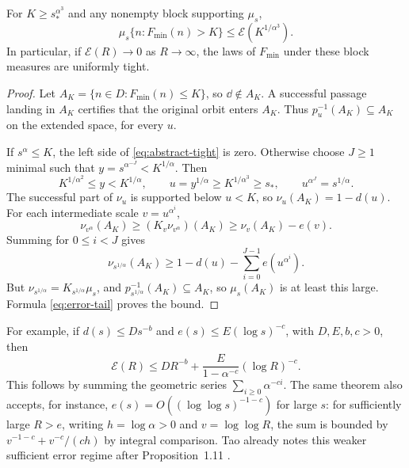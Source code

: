 \begin{theorem}
\label{thm:transport}
For $K\geq s_*^{\alpha^3}$ and any nonempty block supporting $\mu_s$,
\begin{equation}\label{eq:abstract-tight}
 \mu_s\{n:F_{\min}(n)>K\}\leq\mathcal E(K^{1/\alpha^3}).
\end{equation}
In particular, if $\mathcal E(R)\to0$ as $R\to\infty$, the laws of
$F_{\min}$ under these block measures are uniformly tight.
\end{theorem}
\begin{proof}
Let $A_K=\{n\in D:F_{\min}(n)\leq K\}$, so $\dd\notin A_K$.
A successful passage landing in $A_K$ certifies that the original
orbit enters $A_K$.  Thus $p_u^{-1}(A_K)\subseteq A_K$ on the extended
space, for every $u$.

If $s^\alpha\leq K$, the left side of \eqref{eq:abstract-tight} is zero.
Otherwise choose $J\geq1$ minimal such that
$y=s^{\alpha^{-J}}<K^{1/\alpha}$.  Then
\[
 K^{1/\alpha^2}\leq y<K^{1/\alpha},\qquad
 u=y^{1/\alpha}\geq K^{1/\alpha^3}\geq s_*,\qquad
 u^{\alpha^J}=s^{1/\alpha}.
\]
The successful part of $\nu_u$ is supported below $u<K$, so
$\nu_u(A_K)=1-d(u)$.
For each intermediate scale $v=u^{\alpha^i}$,
\[
 \nu_{v^\alpha}(A_K)
 \geq (K_v\nu_{v^\alpha})(A_K)
 \geq \nu_v(A_K)-e(v).
\]
Summing for $0\leq i<J$ gives
\[
 \nu_{s^{1/\alpha}}(A_K)
 \geq1-d(u)-\sum_{i=0}^{J-1}e(u^{\alpha^i}).
\]
But $\nu_{s^{1/\alpha}}=K_{s^{1/\alpha}}\mu_s$, and
$p_{s^{1/\alpha}}^{-1}(A_K)\subseteq A_K$, so
$\mu_s(A_K)$ is at least this large.  Formula \eqref{eq:error-tail}
proves the bound.
\end{proof}

For example, if $d(s)\leq Ds^{-b}$ and $e(s)\leq E(\log s)^{-c}$,
with $D,E,b,c>0$, then
\begin{equation}\label{eq:power-error}
 \mathcal E(R)\leq DR^{-b}
 +\frac{E}{1-\alpha^{-c}}(\log R)^{-c}.
\end{equation}
This follows by summing the geometric series $\sum_{i\geq0}\alpha^{-ci}$.
The same theorem also accepts, for instance,
$e(s)=O((\log\log s)^{-1-c})$ for large $s$: for sufficiently large
$R>e$, writing
$h=\log\alpha>0$ and $v=\log\log R$, the sum is bounded by
$v^{-1-c}+v^{-c}/(ch)$ by integral comparison.  Tao already notes this
weaker sufficient error regime after Proposition~1.11 \cite{Tao7}.
